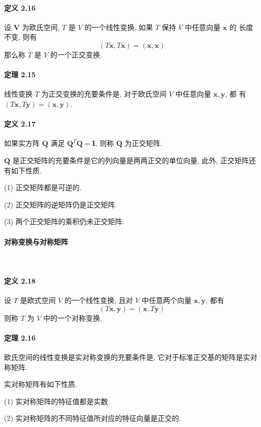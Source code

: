 \paragraph*{定义 2.16} 设 $\bm{V}$ 为欧氏空间, $T$ 是 $V$ 的一个线性变换, 如果 $T$ 保持 $V$ 中任意向量 $\bm{x}$ 的
长度不变, 则有
$$
    (T\bm{x}, T\bm{x}) = (\bm{x}, \bm{x})
$$
那么称 $T$ 是 $V$ 的一个正交变换.

\paragraph*{定理 2.15} 线性变换 $T$ 为正交变换的充要条件是, 对于欧氏空间 $V$ 中任意向量 $\bm{x}, \bm{y}$, 都
有 $(T\bm{x}, T\bm{y}) = (\bm{x}, \bm{y})$.

\paragraph*{定义 2.17} 如果实方阵 $\bm{Q}$ 满足 $\bm{Q}^T\bm{Q} = \bm{I}$, 则称 $\bm{Q}$ 为正交矩阵.

\par $\bm{Q}$ 是正交矩阵的充要条件是它的列向量是两两正交的单位向量, 此外, 正交矩阵还
有如下性质.
\par (1) 正交矩阵都是可逆的.
\par (2) 正交矩阵的逆矩阵仍是正交矩阵.
\par (3) 两个正交矩阵的乘积仍未正交矩阵.

\paragraph[]{对称变换与对称矩阵} \

\paragraph*{定义 2.18} 设 $T$ 是欧式空间 $V$ 的一个线性变换, 且对 $V$ 中任意两个向量 $\bm{x}, \bm{y}$, 都有
$$
    (T\bm{x}, \bm{y}) = (\bm{x}, T\bm{y})
$$
则称 $T$ 为 $V$ 中的一个对称变换.

\paragraph*{定理 2.16} 欧氏空间的线性变换是实对称变换的充要条件是, 它对于标准正交基的矩阵是实对称矩阵.

\par 实对称矩阵有如下性质.

\par (1) 实对称矩阵的特征值都是实数.
\par (2) 实对称矩阵的不同特征值所对应的特征向量是正交的.


